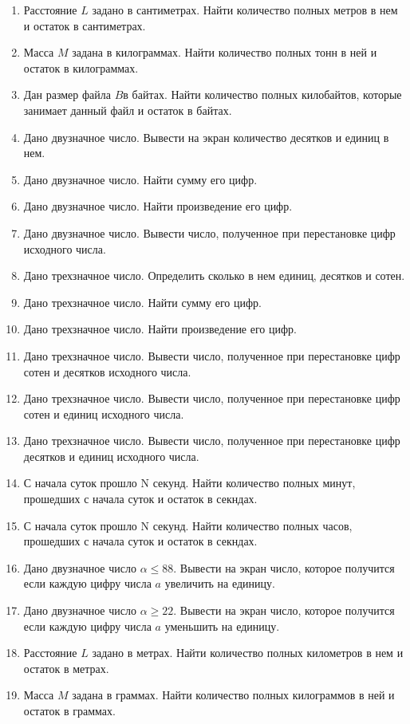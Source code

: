 \begin{enumerate}
\item Расстояние $L$ задано в сантиметрах. Найти количество полных метров в нем и остаток в
сантиметрах.
\item Масса $M$ задана в килограммах. Найти количество полных тонн в ней и остаток в килограммах.
\item Дан размер файла $B$в байтах. Найти количество полных килобайтов, которые занимает данный файл
и остаток в байтах.
\item Дано двузначное число. Вывести на экран количество десятков и единиц в нем.
\item Дано двузначное число. Найти сумму его цифр.
\item Дано двузначное число. Найти произведение его цифр.
\item Дано двузначное число. Вывести число, полученное при перестановке цифр исходного числа.
\item Дано трехзначное число. Определить сколько в нем единиц, десятков и сотен.
\item Дано трехзначное число. Найти сумму его цифр.
\item Дано трехзначное число. Найти произведение его цифр.
\item Дано трехзначное число. Вывести число, полученное при перестановке цифр сотен и десятков исходного числа.
\item Дано трехзначное число. Вывести число, полученное при перестановке цифр сотен и единиц исходного числа.
\item Дано трехзначное число. Вывести число, полученное при перестановке цифр десятков и единиц исходного числа.
\item С начала суток прошло N секунд. Найти количество полных минут, прошедших с начала суток и остаток в секндах.
\item С начала суток прошло N секунд. Найти количество полных часов, прошедших с начала суток и остаток в секндах.
\item Дано двузначное число $\alpha\le 88$. Вывести на экран число, которое получится если каждую цифру числа
$a$ увеличить на единицу.
\item Дано двузначное число $\alpha\ge 22$. Вывести на экран число, которое получится если каждую цифру числа
$a$ уменьшить на единицу.
\item Расстояние $L$ задано в метрах. Найти количество полных километров в нем и остаток в метрах.
\item Масса $M$ задана в граммах. Найти количество полных килограммов в ней и остаток в граммах.

\end{enumerate}
